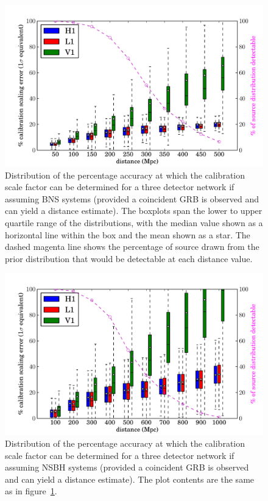 \documentclass[10pt]{iopart}
\begin{document}
\begin{figure}
 \begin{center}
  \includegraphics[width=1.0\textwidth]{scale_factor.pdf}
 \end{center}
 \caption{\label{fig:bnsresults} Distribution of the percentage accuracy at which the calibration 
scale factor can be determined for a three detector network if assuming \ac{BNS} systems (provided 
a coincident GRB is observed and can yield a distance estimate). The boxplots span the lower to 
upper quartile range of the distributions, with the median value shown as a horizontal line within 
the box and the mean shown as a star. The dashed magenta line shows the percentage of source drawn 
from the prior distribution that would be detectable at each distance value.}
\end{figure}

\begin{figure}
 \begin{center}
  \includegraphics[width=1.0\textwidth]{scale_factor_nsbh.pdf}
 \end{center}
 \caption{\label{fig:nsbhresults} Distribution of the percentage accuracy at which the calibration 
scale factor can be determined for a three detector network if assuming \ac{NSBH} systems (provided 
a coincident GRB is observed and can yield a distance estimate). The plot contents are the same as 
in figure~\ref{fig:bnsresults}.}
\end{figure}
\end{document}
